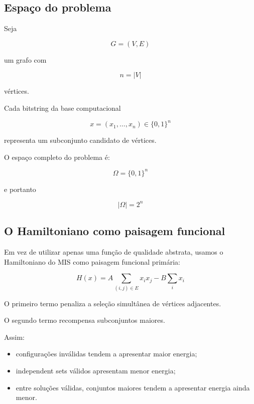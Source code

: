 \documentclass[11pt,a4paper]{article}
\begin{document}
\subsection{Espaço do problema}

Seja

\[
G=(V,E)
\]

um grafo com

\[
n=|V|
\]

vértices.

Cada bitstring da base computacional

\[
x=(x_1,\ldots,x_n)\in\{0,1\}^n
\]

representa um subconjunto candidato de vértices.

O espaço completo do problema é:

\begin{definitionbox}

\[
\boxed{
\Omega=\{0,1\}^n
}
\]

e portanto

\[
\boxed{
|\Omega|=2^n
}
\]

\end{definitionbox}

\subsection{O Hamiltoniano como paisagem funcional}

Em vez de utilizar apenas uma função de qualidade abstrata,
usamos o Hamiltoniano do MIS como paisagem funcional primária:

\begin{definitionbox}

\[
\boxed{
H(x)
=
A\sum_{(i,j)\in E}x_i x_j
-
B\sum_i x_i
}
\]

\end{definitionbox}

O primeiro termo penaliza a seleção simultânea de vértices adjacentes.

O segundo termo recompensa subconjuntos maiores.

Assim:

\begin{itemize}[leftmargin=1.5em]
    \item configurações inválidas tendem a apresentar maior energia;
    \item independent sets válidos apresentam menor energia;
    \item entre soluções válidas, conjuntos maiores tendem a apresentar
    energia ainda menor.
\end{itemize}
\end{document}
